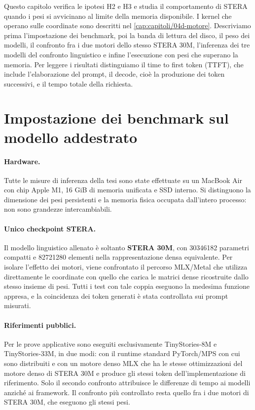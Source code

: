 Questo capitolo verifica le ipotesi H2 e H3 e studia il comportamento di STERA quando i pesi si avvicinano al limite della memoria disponibile. I kernel che operano sulle coordinate sono descritti nel \autoref{cap:capitoli/04d-motore}. Descriviamo prima l'impostazione dei benchmark, poi la banda di lettura del disco, il peso dei modelli, il confronto fra i due motori dello stesso STERA 30M, l'inferenza dei tre modelli del confronto linguistico e infine l'esecuzione con pesi che superano la memoria. Per leggere i risultati distinguiamo il time to first token (TTFT), che include l'elaborazione del prompt, il decode, cioè la produzione dei token successivi, e il tempo totale della richiesta.

\section{Impostazione dei benchmark sul modello addestrato}
\label{sec:sistemi-impostazione}

\paragraph{Hardware.} Tutte le misure di inferenza della tesi sono state effettuate su un MacBook Air con chip Apple M1, 16 GiB di memoria unificata e SSD interno. Si distinguono la dimensione dei pesi persistenti e la memoria fisica occupata dall'intero processo: non sono grandezze intercambiabili.

\paragraph{Unico checkpoint STERA.} Il modello linguistico allenato è soltanto \textbf{STERA 30M}, con \num{30346182} parametri compatti e \num{82721280} elementi nella rappresentazione densa equivalente. Per isolare l'effetto dei motori, viene confrontato il percorso MLX/Metal che utilizza direttamente le coordinate con quello che carica le matrici dense ricostruite dallo stesso insieme di pesi. Tutti i test con tale coppia eseguono la medesima funzione appresa, e la coincidenza dei token generati è stata controllata sui prompt misurati.

\paragraph{Riferimenti pubblici.} Per le prove applicative sono eseguiti esclusivamente TinyStories-8M e TinyStories-33M, in due modi: con il runtime standard PyTorch/MPS con cui sono distribuiti e con un motore denso MLX che ha le stesse ottimizzazioni del motore denso di STERA 30M e produce gli stessi token dell'implementazione di riferimento. Solo il secondo confronto attribuisce le differenze di tempo ai modelli anziché ai framework. Il confronto più controllato resta quello fra i due motori di STERA 30M, che eseguono gli stessi pesi.

